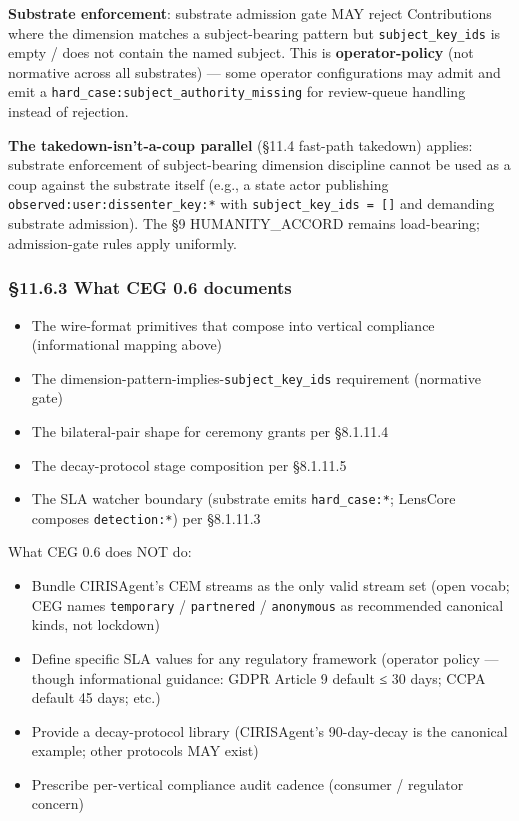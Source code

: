 \documentclass[11pt]{article}
\begin{document}
\textbf{Substrate enforcement}: substrate admission gate MAY reject Contributions where the dimension matches a subject-bearing pattern but \texttt{subject\_key\_ids} is empty / does not contain the named subject. This is \textbf{operator-policy} (not normative across all substrates) — some operator configurations may admit and emit a \texttt{hard\_case:subject\_authority\_missing} for review-queue handling instead of rejection.


\textbf{The takedown-isn't-a-coup parallel} (§11.4 fast-path takedown) applies: substrate enforcement of subject-bearing dimension discipline cannot be used as a coup against the substrate itself (e.g., a state actor publishing \texttt{observed:user:dissenter\_key:*} with \texttt{subject\_key\_ids = []} and demanding substrate admission). The §9 HUMANITY\_ACCORD remains load-bearing; admission-gate rules apply uniformly.


\subsubsection*{§11.6.3 What CEG 0.6 documents}


\begin{itemize}\setlength\itemsep{0pt}
\item The wire-format primitives that compose into vertical compliance (informational mapping above)
\item The dimension-pattern-implies-\texttt{subject\_key\_ids} requirement (normative gate)
\item The bilateral-pair shape for ceremony grants per §8.1.11.4
\item The decay-protocol stage composition per §8.1.11.5
\item The SLA watcher boundary (substrate emits \texttt{hard\_case:*}; LensCore composes \texttt{detection:*}) per §8.1.11.3
\end{itemize}


What CEG 0.6 does NOT do:

\begin{itemize}\setlength\itemsep{0pt}
\item Bundle CIRISAgent's CEM streams as the only valid stream set (open vocab; CEG names \texttt{temporary} / \texttt{partnered} / \texttt{anonymous} as recommended canonical kinds, not lockdown)
\item Define specific SLA values for any regulatory framework (operator policy — though informational guidance: GDPR Article 9 default ≤ 30 days; CCPA default 45 days; etc.)
\item Provide a decay-protocol library (CIRISAgent's 90-day-decay is the canonical example; other protocols MAY exist)
\item Prescribe per-vertical compliance audit cadence (consumer / regulator concern)
\end{itemize}
\end{document}
